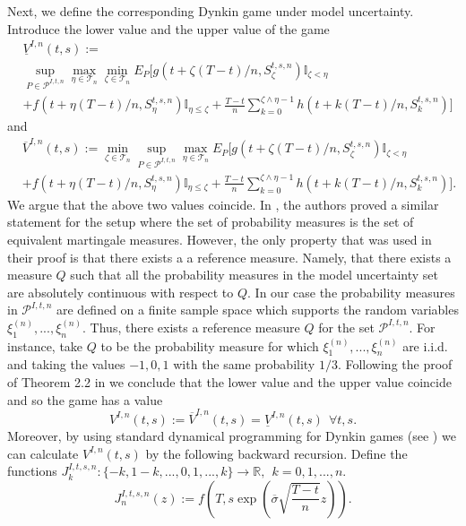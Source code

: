 \documentclass{amsart}
\numberwithin{equation}{section}
\begin{document}
Next, we define the corresponding Dynkin game under model uncertainty.
Introduce the lower value and the upper value of the game
\begin{eqnarray*}
&\underline{V}^{I,n}(t,s):=\\
&\sup_{ P\in \mathcal{P}^{I,t,n}}\max_{\eta\in\mathcal T_n}
\min_{\zeta\in\mathcal T_n} E_{P}[g(t+\zeta (T-t)/n,S^{t,s,n}_{\zeta})\mathbb{I}_{\zeta<\eta}\nonumber\\
&+f(t+\eta (T-t)/n,S^{t,s,n}_{\eta})\mathbb{I}_{\eta\leq\zeta}+\frac{T-t}{n}\sum_{k=0}^{\zeta\wedge\eta-1} h(t+k(T-t)/n,S^{t,s,n}_{k})]
\end{eqnarray*}
and
\begin{eqnarray*}
&\overline{V}^{I,n}(t,s):=\min_{\zeta\in\mathcal T_n}\sup_{ P\in \mathcal{P}^{I,t,n}}\max_{\eta\in\mathcal T_n}
E_{P}[g(t+\zeta (T-t)/n,S^{t,s,n}_{\zeta})\mathbb{I}_{\zeta<\eta}\nonumber\\
&+f(t+\eta (T-t)/n,S^{t,s,n}_{\eta})\mathbb{I}_{\eta\leq\zeta}+\frac{T-t}{n}\sum_{k=0}^{\zeta\wedge\eta-1} h(t+k(T-t)/n,S^{t,s,n}_{k})].\nonumber
\end{eqnarray*}
We argue that the above two values coincide. In \cite{KK}, the authors proved a similar statement for the setup where the set of probability
measures is the set of
 equivalent martingale measures. However, the only property that was used in their proof is that there exists a
 a reference measure. Namely, that there exists a measure $Q$ such that all the probability measures in the model uncertainty set
 are absolutely continuous with respect to $Q$.
 In our case the probability measures in $\mathcal{P}^{I,t,n}$ are defined on a finite sample space which supports the random variables
$\xi^{(n)}_1,...,\xi^{(n)}_n$. Thus, there exists a reference measure
$Q$ for the set $\mathcal{P}^{I,t,n}$. For instance,
take $Q$ to be the probability measure for which $\xi^{(n)}_1,...,\xi^{(n)}_n$ are i.i.d. and taking the values
$-1,0,1$ with the same probability $1/3$. Following the
proof of
Theorem 2.2 in \cite{KK} we conclude that the lower value and the upper value coincide and
so the game has a value
$${V}^{I,n}(t,s):=\overline{V}^{I,n}(t,s)=\underline{V}^{I,n}(t,s) \ \ \forall t,s.$$
Moreover, by using standard dynamical programming for Dynkin games (see \cite{O})
we can calculate $V^{I,n}(t,s)$
by the following backward recursion.
Define the functions
${J}^{I,t,s,n}_k:\{-k,1-k,...,0,1,...,k\}\rightarrow\mathbb R, \ \ k=0,1,...,n.$
\begin{equation}\label{recursion1}
{J}^{I,t,s,n}_n(z):=f\left(T,s \exp\left(\overline{\sigma}\sqrt{\frac{T-t}{n}}z\right)\right).
\end{equation}
\end{document}
